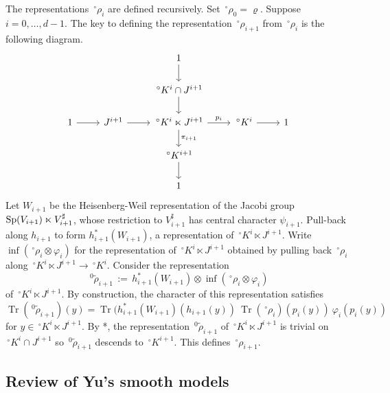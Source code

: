 \documentclass[10pt]{amsart}
\theoremstyle{plain}
\theoremstyle{definition}
\DeclareMathOperator{\trace}{Tr}
\newcommand{\ceq}{{\, :=\, }}
\begin{document}
The representations $\,^\circ \rho_i$ are defined recursively. Set $\,^\circ \rho_0 = \varrho$.
Suppose $i=0, \ldots, d-1$.
The key to defining the representation $\,^\circ\rho_{i+1}$ from $\,^\circ \rho_i$ is the following diagram.
\begin{equation}\label{eq:semiprod}
\begin{tikzcd}
\ && 1 \arrow{d} && \\
\ && \,^\circ K^{i}\cap J^{i+1}\arrow{d} && \\
1 \arrow{r} & J^{i+1} \arrow{r} & \,^\circ K^i \ltimes J^{i+1} \arrow{d}{\pi_{i+1}} \arrow{r}{p_i} & \,^\circ K^i \arrow{r} & 1\\
&& \,^\circ K^{i+1} \arrow{d}{} && \\
&& 1 &&
\end{tikzcd}
\end{equation}
Let $W_{i+1}$ be the Heisenberg-Weil representation of the Jacobi group ${\operatorname{Sp}}(V_{i+1})\ltimes V_{i+1}^\sharp$, whose restriction to $V_{i+1}^\sharp$ has central character $\psi_{i+1}$.
Pull-back along $h_{i+1}$ to form $h_{i+1}^*(W_{i+1})$, a representation of $\,^\circ K^i \ltimes J^{i+1}$.
Write $\inf(\,^\circ\rho_i \otimes \varphi_i)$ for the representation of $\,^\circ K^i \ltimes J^{i+1}$ obtained by pulling back $\,^\circ\rho_i$ along $\,^\circ K^i \ltimes J^{i+1} \to \,^\circ K^i$. 
Consider the representation
\begin{equation}\label{eq:tensor}
\,^0{\tilde\rho}_{i+1} \ceq h_{i+1}^*(W_{i+1}) \otimes \inf(\,^\circ\rho_i \otimes \varphi_i)
\end{equation}
of $\,^\circ K^i \ltimes J^{i+1}$.
By construction, the character of this representation satisfies
\begin{equation}\label{eq:tilderho}
\trace(\,^0{\tilde\rho}_{i+1})(y)= \trace(h_{i+1}^*(W_{i+1})(h_{i+1}(y))\ \trace(\,^\circ\rho_i)(p_i(y))\ \varphi_i(p_i(y))
\end{equation}
for $y \in \,^\circ K^i \ltimes J^{i+1}$.
By \cite{yu:01a}*{}, the representation $\,^0{\tilde\rho}_{i+1}$ of $\,^\circ K^i \ltimes J^{i+1}$ is trivial on $\,^\circ K^{i}\cap J^{i+1}$ so $\,^0{\tilde\rho}_{i+1}$ descends to $\,^\circ K^{i+1}$. 
This defines $\,^\circ \rho_{i+1}$.

\subsection{Review of Yu's smooth models}\label{ssec:models}
\end{document}

